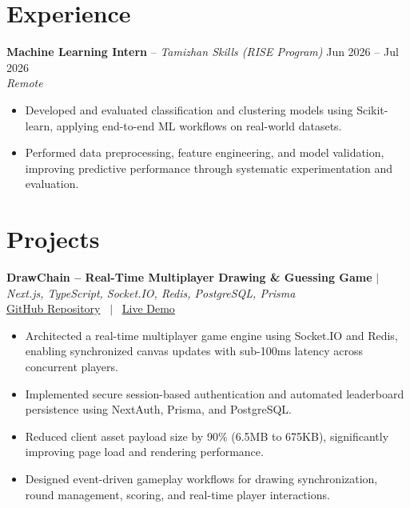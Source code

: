 \documentclass[10pt, a4paper]{article}
\begin{document}

\section{Experience}

\textbf{Machine Learning Intern} -- \textit{Tamizhan Skills (RISE Program)} \hfill Jun 2026 -- Jul 2026 \\
\textit{\small{Remote}} \\
\begin{itemize}

    \item Developed and evaluated classification and clustering models using Scikit-learn, applying end-to-end ML workflows on real-world datasets.

    \item Performed data preprocessing, feature engineering, and model validation, improving predictive performance through systematic experimentation and evaluation.

\end{itemize}
\vspace{2pt}



\section{Projects}

\textbf{DrawChain -- Real-Time Multiplayer Drawing \& Guessing Game} $|$ \textit{Next.js, TypeScript, Socket.IO, Redis, PostgreSQL, Prisma} \\

\small{
\href{https://github.com}{GitHub Repository}
 \ $|$ \ \href{https://demo.example.com}{Live Demo}
} \\

\begin{itemize}

    \item Architected a real-time multiplayer game engine using Socket.IO and Redis, enabling synchronized canvas updates with sub-100ms latency across concurrent players.

    \item Implemented secure session-based authentication and automated leaderboard persistence using NextAuth, Prisma, and PostgreSQL.

    \item Reduced client asset payload size by 90\% (6.5MB to 675KB), significantly improving page load and rendering performance.

    \item Designed event-driven gameplay workflows for drawing synchronization, round management, scoring, and real-time player interactions.

\end{itemize}
\vspace{2pt}
\end{document}
